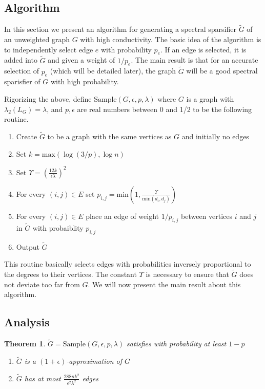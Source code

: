 \documentclass[12pt,twoside]{article}
\newtheorem{thm}{Theorem}
\newenvironment{centered}[0]{
  \begin{list}{}{
    \setlength{\topsep}{0pt}
    \setlength{\leftmargin}{.25in}
    \setlength{\rightmargin}{.25in}
    \setlength{\listparindent}{\parindent}
    \setlength{\itemindent}{\parindent}
    \setlength{\parsep}{\parskip}
  }
  \item[]}{\end{list}}
\begin{document}
\subsection{Algorithm}

In this section we present an algorithm for generating a spectral sparsifier $\tilde{G}$ of an unweighted graph $G$ with high conductivity. The basic idea of the algorithm is to independently select edge $e$ with probability $p_e$. If an edge is selected, it is added into $\tilde{G}$ and given a weight of $1/p_e$. The main result is that for an accurate selection of $p_e$ (which will be detailed later), the graph $\tilde{G}$ will be a good spectral sparisfier of $G$ with high probability.

Rigorizing the above, define $\text{Sample}(G, \epsilon, p, \lambda)$ where $G$ is a graph with $\lambda_2(L_G) = \lambda$, and $p, \epsilon$ are real numbers between 0 and 1/2 to be the following routine.

\begin{centered}
    \begin{enumerate}
        \item Create $\tilde{G}$ to be a graph with the same vertices as $G$ and initially no edges
        \item Set $k = \text{max}(\log{(3/p)}, \log{n})$
        \item Set $\Upsilon = (\frac{12k}{\epsilon\lambda})^2$
        \item For every $(i,j) \in E$ set $p_{i,j} = \text{min}(1, \frac{\Upsilon}{\text{min}(d_i,d_j)})$
        \item For every $(i,j) \in E$ place an edge of weight $1/p_{i,j}$ between vertices $i$ and $j$ in $\tilde{G}$ with probaiblity $p_{i,j}$
        \item Output $\tilde{G}$
    \end{enumerate}
\end{centered}

This routine basically selects edges with probabilities inversely proportional to the degrees to their vertices. The constant $\Upsilon$ is necessary to ensure that $\tilde{G}$ does not deviate too far from $G$. We will now present the main result about this algorithm.

\subsection{Analysis}

\begin{thm}
$\tilde{G} = \text{Sample}(G, \epsilon, p, \lambda)$ satisfies with probability at least $1 - p$

\begin{enumerate}
    \item $\tilde{G}$ is a $(1 + \epsilon)$-approximation of $G$
    \item $\tilde{G}$ has at most $\frac{288nk^2}{\epsilon^2\lambda^2}$ edges
\end{enumerate}
\end{thm}
\end{document}
